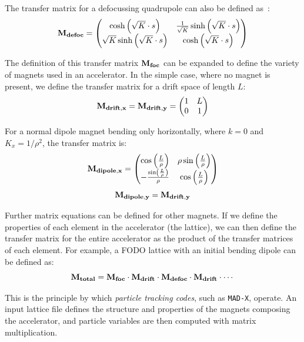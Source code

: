 \documentclass[a4paper,twoside,11pt]{report}
\begin{document}
The transfer matrix for a defocussing quadrupole can also be defined as~\cite{Hillert:2107.02614}:
\begin{equation}
  \bf{M_{defoc}}=
  \begin{pmatrix}
    \cosh\left(\sqrt{K}\cdot s\right) & \frac1{\sqrt{K}}\sinh\left(\sqrt{K}\cdot s\right) \\
    \sqrt{K}\sinh\left(\sqrt{K}\cdot s\right) & \cosh\left(\sqrt{K}\cdot s\right)
  \end{pmatrix}
\end{equation}

The definition of this transfer matrix $\bf M_{foc}$ can be expanded to define the variety of magnets used in an accelerator. In the simple case, where no magnet is present, we define the transfer matrix for a drift space of length $L$:
\begin{equation}
  \bf{M}_{drift,x}=\bf{M}_{drift,y}=
  \begin{pmatrix}
    1 & L \\
    0 & 1
  \end{pmatrix}
\end{equation}

For a normal dipole magnet bending only horizontally, where $k=0$ and $K_x=1/\rho^2$, the transfer matrix is:
\begin{equation}
  \bf{M}_{dipole,x}=
  \begin{pmatrix}
    \cos\left(\frac L\rho\right) & \rho\sin\left(\frac L\rho\right) \\
    -\frac{\sin\left(\frac L\rho\right)}{\rho} & \cos\left(\frac L\rho\right)
  \end{pmatrix}
\end{equation}
\begin{equation}
  \bf{M}_{dipole,y}=\bf{M}_{drift,y}
\end{equation}

Further matrix equations can be defined for other magnets. If we define the properties of each element in the accelerator (the lattice), we can then define the transfer matrix for the entire accelerator as the product of the transfer matrices of each element. For example, a FODO lattice with an initial bending dipole can be defined as:
\begin{equation}
  \bf{M}_{total} = \bf{M}_{foc} \cdot \bf{M}_{drift} \cdot \bf{M}_{defoc} \cdot \bf{M}_{drift} \cdot\cdots
\end{equation}

This is the principle by which \textit{particle tracking codes}, such as \verb|MAD-X|, operate. An input lattice file defines the structure and properties of the magnets composing the accelerator, and particle variables are then computed with matrix multiplication. 
\end{document}

